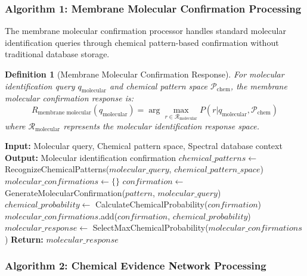 \documentclass[11pt,a4paper]{article}
\newtheorem{definition}[theorem]{Definition}
\theoremstyle{remark}
\begin{document}
\subsubsection{Algorithm 1: Membrane Molecular Confirmation Processing}

The membrane molecular confirmation processor handles standard molecular identification queries through chemical pattern-based confirmation without traditional database storage.

\begin{definition}[Membrane Molecular Confirmation Response]
For molecular identification query $q_{\text{molecular}}$ and chemical pattern space $\mathcal{P}_{\text{chem}}$, the membrane molecular confirmation response is:
\begin{equation}
R_{\text{membrane molecular}}(q_{\text{molecular}}) = \arg\max_{r \in \mathcal{R}_{\text{molecular}}} P(r | q_{\text{molecular}}, \mathcal{P}_{\text{chem}})
\end{equation}
where $\mathcal{R}_{\text{molecular}}$ represents the molecular identification response space.
\end{definition}

\begin{algorithm}[H]
\caption{Sachikonye's Molecular Search Algorithm 1}
\begin{algorithmic}[1]
\State \textbf{Input:} Molecular query, Chemical pattern space, Spectral database context
\State \textbf{Output:} Molecular identification confirmation
\State $chemical\_patterns \gets$ RecognizeChemicalPatterns($molecular\_query$, $chemical\_pattern\_space$)
\State $molecular\_confirmations \gets \{\}$
\State $confirmation \gets$ GenerateMolecularConfirmation($pattern$, $molecular\_query$)
\State $chemical\_probability \gets$ CalculateChemicalProbability($confirmation$)
\State $molecular\_confirmations$.add($confirmation$, $chemical\_probability$)
\EndFor
\State $molecular\_response \gets$ SelectMaxChemicalProbability($molecular\_confirmations$)
\State \textbf{Return:} $molecular\_response$
\EndProcedure
\end{algorithmic}
\end{algorithm}

\subsubsection{Algorithm 2: Chemical Evidence Network Processing}
\end{document}
